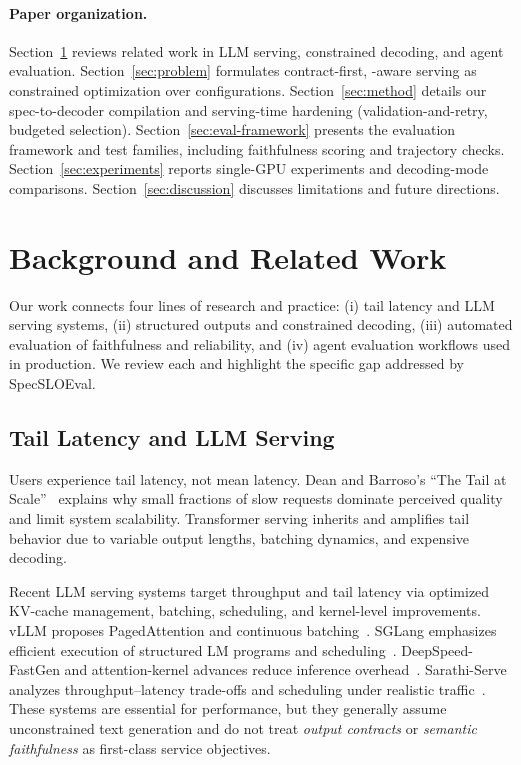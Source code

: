 \paragraph{Paper organization.}
Section~\ref{sec:background} reviews related work in LLM serving, constrained decoding, and agent evaluation.
Section~\ref{sec:problem} formulates contract-first, \slo-aware serving as constrained optimization over configurations.
Section~\ref{sec:method} details our spec-to-decoder compilation and serving-time hardening (validation-and-retry, budgeted selection).
Section~\ref{sec:eval-framework} presents the evaluation framework and test families, including faithfulness scoring and trajectory checks.
Section~\ref{sec:experiments} reports single-GPU experiments and decoding-mode comparisons.
Section~\ref{sec:discussion} discusses limitations and future directions.

\section{Background and Related Work}
\label{sec:background}

Our work connects four lines of research and practice: (i) tail latency and LLM serving systems, (ii) structured outputs and constrained decoding, (iii) automated evaluation of faithfulness and reliability, and (iv) agent evaluation workflows used in production.
We review each and highlight the specific gap addressed by SpecSLOEval.

\subsection{Tail Latency and LLM Serving}

Users experience tail latency, not mean latency.
Dean and Barroso’s “The Tail at Scale”~\citep{dean2013tail} explains why small fractions of slow requests dominate perceived quality and limit system scalability.
Transformer serving inherits and amplifies tail behavior due to variable output lengths, batching dynamics, and expensive decoding.

Recent LLM serving systems target throughput and tail latency via optimized KV-cache management, batching, scheduling, and kernel-level improvements.
vLLM proposes PagedAttention and continuous batching~\citep{kwon2023vllm}.
SGLang emphasizes efficient execution of structured LM programs and scheduling~\citep{zheng2023sglang}.
DeepSpeed-FastGen and attention-kernel advances reduce inference overhead~\citep{deepspeedFastGen,dao2023flashattention2,prabhu2024vattention}.
Sarathi-Serve analyzes throughput--latency trade-offs and scheduling under realistic traffic~\citep{agrawal2024sarathi}.
These systems are essential for performance, but they generally assume unconstrained text generation and do not treat \emph{output contracts} or \emph{semantic faithfulness} as first-class service objectives.

